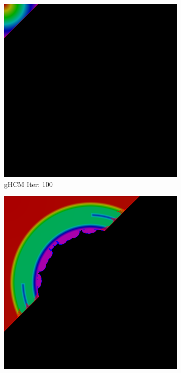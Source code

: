 \documentclass[11pt]{article}       %
\begin{document}
\begin{figure}
\begin{subfigure}[b]{.3\columnwidth}
	\includegraphics[width=\textwidth]{Figures/iter_100_ghcm}
	\caption{gHCM Iter: 100}
\end{subfigure}
\begin{subfigure}[b]{.3\columnwidth}
	\includegraphics[width=\textwidth]{Figures/iter_400_ghcm}

\end{subfigure}
\end{figure}
\end{document}
